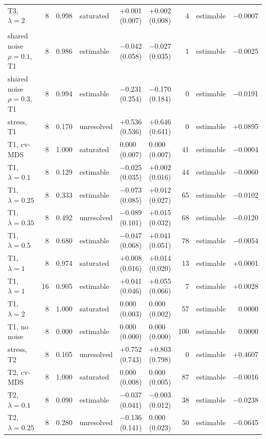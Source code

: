 \documentclass[11pt]{article}
\begin{document}
\begin{table}[!htb]
\begin{tabular}{lrrlllrlr}
\quad T3, $\lambda=2$ & 8 & 0.998 & saturated & +0.001 (0.007) & +0.002 (0.008) & 4 & estimable & $-$0.0007 \\
\addlinespace
\multicolumn{9}{l}{\textit{Mouse V1}} \\
\quad shared noise $\rho=0.1$, T1 & 8 & 0.986 & estimable & $-$0.042 (0.058) & $-$0.027 (0.035) & 1 & estimable & $-$0.0025 \\
\quad shared noise $\rho=0.3$, T1 & 8 & 0.994 & estimable & $-$0.231 (0.254) & $-$0.170 (0.184) & 0 & estimable & $-$0.0191 \\
\quad stress, T1 & 8 & 0.170 & unresolved & +0.536 (0.536) & +0.646 (0.641) & 0 & estimable & +0.0895 \\
\quad T1, cv-MDS & 8 & 1.000 & saturated & 0.000 (0.007) & 0.000 (0.007) & 41 & estimable & $-$0.0004 \\
\quad T1, $\lambda=0.1$ & 8 & 0.129 & estimable & $-$0.025 (0.035) & +0.002 (0.016) & 44 & estimable & $-$0.0060 \\
\quad T1, $\lambda=0.25$ & 8 & 0.333 & estimable & $-$0.073 (0.085) & +0.012 (0.027) & 65 & estimable & $-$0.0102 \\
\quad T1, $\lambda=0.35$ & 8 & 0.492 & unresolved & $-$0.089 (0.101) & +0.015 (0.032) & 68 & estimable & $-$0.0120 \\
\quad T1, $\lambda=0.5$ & 8 & 0.680 & estimable & $-$0.047 (0.068) & +0.041 (0.051) & 78 & estimable & $-$0.0054 \\
\quad T1, $\lambda=1$ & 8 & 0.974 & saturated & +0.008 (0.016) & +0.014 (0.020) & 13 & estimable & +0.0001 \\
\quad T1, $\lambda=1$ & 16 & 0.905 & estimable & +0.041 (0.046) & +0.055 (0.066) & 7 & estimable & +0.0028 \\
\quad T1, $\lambda=2$ & 8 & 1.000 & saturated & 0.000 (0.003) & 0.000 (0.002) & 57 & estimable & 0.0000 \\
\quad T1, no noise & 8 & 0.000 & estimable & 0.000 (0.000) & 0.000 (0.000) & 100 & estimable & 0.0000 \\
\quad stress, T2 & 8 & 0.105 & unresolved & +0.752 (0.743) & +0.803 (0.798) & 0 & estimable & +0.4607 \\
\quad T2, cv-MDS & 8 & 1.000 & saturated & 0.000 (0.008) & 0.000 (0.005) & 87 & estimable & $-$0.0016 \\
\quad T2, $\lambda=0.1$ & 8 & 0.090 & estimable & $-$0.037 (0.041) & $-$0.003 (0.012) & 38 & estimable & $-$0.0238 \\
\quad T2, $\lambda=0.25$ & 8 & 0.280 & unresolved & $-$0.136 (0.141) & 0.000 (0.023) & 50 & estimable & $-$0.0645 \\

\end{tabular}
\end{table}
\end{document}
